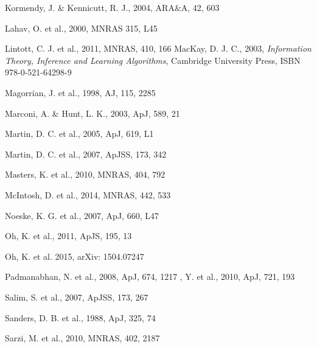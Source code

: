 \documentclass[useAMS,usenatbib]{mn2e}
\begin{document}
\begin{thebibliography}{}
 Kormendy, J. \& Kennicutt, R. J., 2004, ARA\&A, 42, 603

 Lahav, O. et al., 2000, MNRAS 315, L45

 Lintott, C. J. et al., 2011, MNRAS, 410, 166
 MacKay, D. J. C., 2003, \emph{Information Theory, Inference and Learning Algorithms}, Cambridge University Press, ISBN 978-0-521-64298-9

 Magorrian, J. et al., 1998, AJ, 115, 2285

 Marconi, A. \& Hunt, L. K., 2003, ApJ, 589, 21

 Martin, D. C. et al., 2005, ApJ, 619, L1


 Martin, D. C. et al., 2007, ApJSS, 173, 342

 Masters, K. et al., 2010, MNRAS, 404, 792

 McIntosh, D. et al., 2014, MNRAS, 442, 533

 Noeske, K. G. et al., 2007, ApJ, 660, L47


 Oh, K. et al., 2011, ApJS, 195, 13

 Oh, K. et al. 2015, arXiv: 1504.07247

 Padmanabhan, N. et al., 2008, ApJ, 674, 1217
 , Y. et al., 2010, ApJ, 721, 193

 Salim, S. et al., 2007, ApJSS, 173, 267

 Sanders, D. B. et al., 1988, ApJ, 325, 74

 Sarzi, M. et al., 2010, MNRAS, 402, 2187


\end{thebibliography}
\end{document}
